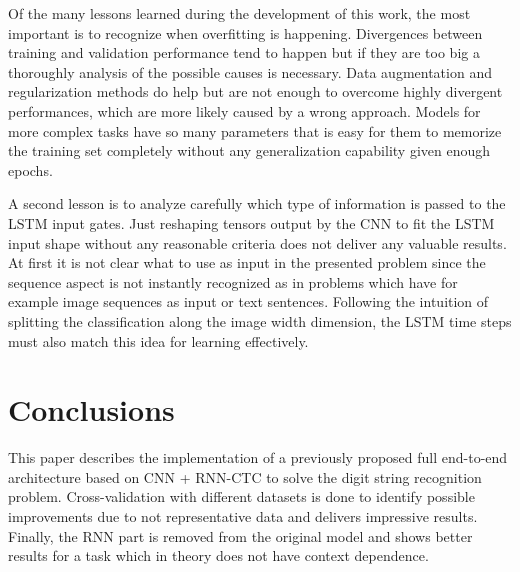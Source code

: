 Of the many lessons learned during the development of this work, the most
important is to recognize when overfitting is happening. Divergences between
training and validation performance tend to happen but if they are too big a
thoroughly analysis of the possible causes is necessary. Data augmentation and
regularization methods do help but are not enough to overcome highly divergent
performances, which are more likely caused by a wrong approach. Models for more
complex tasks have so many parameters that is easy for them to memorize the
training set completely without any generalization capability given enough
epochs. 

A second lesson is to analyze carefully which type of information is passed to
the LSTM input gates. Just reshaping tensors output by the CNN to fit the LSTM
input shape without any reasonable criteria does not deliver any valuable
results. At first it is not clear what to use as input in the presented problem
since the sequence aspect is not instantly recognized as in problems which have
for example image sequences as input or text sentences. Following the intuition
of splitting the classification along the image width dimension, the LSTM time
steps must also match this idea for learning effectively.

\section{Conclusions}\label{sec:conclusion}

This paper describes the implementation of a previously proposed full end-to-end
architecture based on CNN + RNN-CTC to solve the digit string recognition
problem. Cross-validation with different datasets is done to identify possible
improvements due to not representative data and delivers impressive results.
Finally, the RNN part is removed from the original model and shows better
results for a task which in theory does not have context dependence. 

